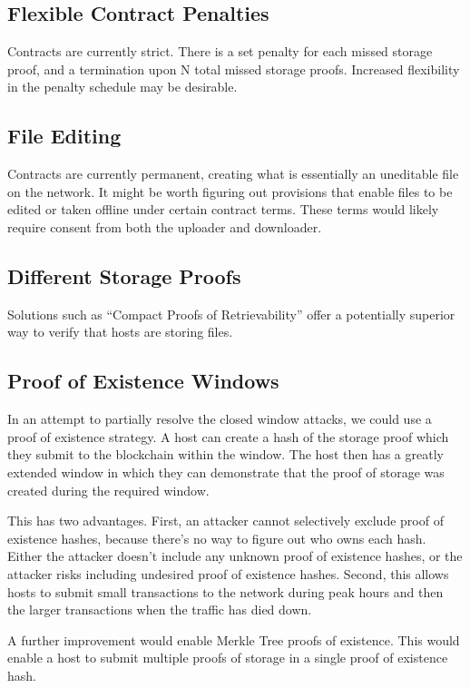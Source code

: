 \documentclass[twocolumn]{article}
\begin{document}
\subsection{Flexible Contract Penalties}
Contracts are currently strict.
There is a set penalty for each missed storage proof, and a termination upon N total missed storage proofs.
Increased flexibility in the penalty schedule may be desirable.

\subsection{File Editing}
Contracts are currently permanent, creating what is essentially an uneditable file on the network.
It might be worth figuring out provisions that enable files to be edited or taken offline under certain contract terms.
These terms would likely require consent from both the uploader and downloader.

\subsection{Different Storage Proofs}
Solutions such as ``Compact Proofs of Retrievability'' \cite{cpr} offer a potentially superior way to verify that hosts are storing files.

\subsection{Proof of Existence Windows}
In an attempt to partially resolve the closed window attacks, we could use a proof of existence strategy.
A host can create a hash of the storage proof which they submit to the blockchain within the window.
The host then has a greatly extended window in which they can demonstrate that the proof of storage was created during the required window.

This has two advantages.
First, an attacker cannot selectively exclude proof of existence hashes, because there's no way to figure out who owns each hash.
Either the attacker doesn't include any unknown proof of existence hashes, or the attacker risks including undesired proof of existence hashes.
Second, this allows hosts to submit small transactions to the network during peak hours and then the larger transactions when the traffic has died down.

A further improvement would enable Merkle Tree proofs of existence.
This would enable a host to submit multiple proofs of storage in a single proof of existence hash.
\end{document}
